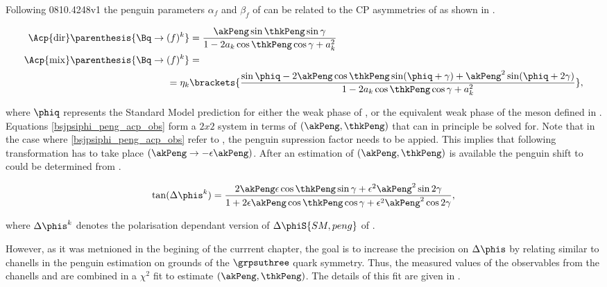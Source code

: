 Following {\color{red} 0810.4248v1} the penguin parameters $\alpha_f$ and $\beta_f$ of 
can be related to the CP asymmetries of  as shown in .

\begin{subequations}
  \label{bsjpsiphi_peng_acp_obs}
\begin{align}
  \Acp{\rm dir}\parenthesis{\Bq\to (f)^k} &= \frac{ \akPeng \sin\thkPeng \sin\gamma} {1 - 2 a_k \cos\thkPeng \cos\gamma + a_k^{2}}
  \label{bsjpsiphi_peng_acp_dir} \\
  \Acp{\rm mix}\parenthesis{\Bq\to (f)^k} &= \nonumber \\
   = \eta_k & \brackets{\frac{\sin\phiq - 2\akPeng \cos\thkPeng\sin(\phiq+\gamma) + \akPeng^2 \sin(\phiq+2\gamma)}
                                                                 {1 - 2 a_k \cos\thkPeng \cos\gamma + a_k^{2}} },
  \label{bsjpsiphi_peng_acp_mix}
\end{align}
\end{subequations}

\noindent where $\phiq$ represents the Standard Model prediction for either the weak phase \phis of ,
or the equivalent weak phase \phid of the \Bd meson defined in .
Equations \ref{bsjpsiphi_peng_acp_obs} form a $2x2$ system in terms of $(\akPeng,\thkPeng)$ that can in principle be solved
for. Note that in the case where \eqref{bsjpsiphi_peng_acp_obs} refer to \BsJpsiPhi, the penguin supression factor
needs to be appied. This implies that following transformation has to take place $(\akPeng\to-\epsilon\akPeng)$.
After an estimation of $(\akPeng,\thkPeng)$ is available the penguin shift to \phis could be determined from .

\begin{equation}
\centering
\tan(\Delta\phis^k) = \frac{ 2\akPeng\epsilon\cos\thkPeng \sin\gamma + \epsilon^2\akPeng^2 \sin2\gamma}
                             {1 + 2\epsilon\akPeng \cos\thkPeng \cos\gamma + \epsilon^2\akPeng^2 \cos2\gamma},
\label{tandelta}
\end{equation}

\noindent where $\Delta\phis^k$ denotes the polarisation
dependant version of $\Delta\phiS{SM, peng}$ of .

However, as it was metnioned in the begining of the currrent chapter, the goal is to increase the precision on $\Delta{\phis}$
by relating similar to \BsJpsiPhi chanells in the penguin estimation on grounds of the $\grpsuthree$ quark symmetry.
Thus, the measured values of the observables  from the chanells \BsJpsiKst and \BdJpsiRho
are combined in a $\chi^2$ fit to estimate $(\akPeng,\thkPeng)$. The details of this fit are given in .


